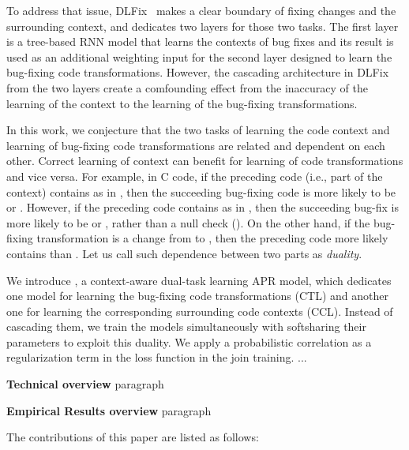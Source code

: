 To address that issue, DLFix~\cite{icse20} makes a clear boundary of
fixing changes and the surrounding context, and dedicates two layers
for those two tasks. The first layer is a tree-based RNN model that
learns the contexts of bug fixes and its result is used as an
additional weighting input for the second layer designed to learn the
bug-fixing code transformations. However, the cascading architecture
in DLFix from the two layers create a comfounding effect from the
inaccuracy of the learning of the context to the learning of the
bug-fixing transformations.

In this work, we conjecture that the two tasks of learning the code
context and learning of bug-fixing code transformations are related
and dependent on each other. Correct learning of context can benefit
for learning of code transformations and vice versa. For example, in
C code, if the preceding code (i.e., part of the context) contains
 as in , then the
succeeding bug-fixing code is more likely to be 
or . However, if the preceding code contains
 as in , then the
succeeding bug-fix is more likely to be  or
, rather than a null check ().  On the other hand, if the bug-fixing transformation is a
change from  to , then the
preceding code more likely contains  than .
Let us call such dependence between two parts as {\em duality}.

We introduce {\tool}, a context-aware dual-task learning APR model,
which dedicates one model for learning the bug-fixing code
transformations (CTL) and another one for learning the corresponding
surrounding code contexts (CCL). Instead of cascading them, we train
the models simultaneously with softsharing their parameters to exploit
this duality. We apply a probabilistic correlation as a regularization
term in the loss function in the join training. ...

{\bf Technical overview} paragraph

{\bf Empirical Results overview} paragraph

The contributions of this paper are listed as follows:


